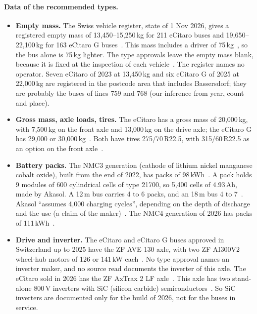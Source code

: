 \documentclass[11pt,a4paper]{article}
\theoremstyle{plain}
\theoremstyle{definition}
\theoremstyle{remark}
\begin{document}
\paragraph{Data of the recommended types.}
\begin{itemize}
  \item \textbf{Empty mass.} The Swiss vehicle register, state of 1 Nov 2026, gives a registered empty mass of 13,450--15,250\,kg for 211 eCitaro buses and 19,650--22,100\,kg for 163 eCitaro G buses~\cite{ASTRA2026Stock}.
    This mass includes a driver of 75\,kg~\cite[Art.~7 para.~1]{VTS2026}, so the bus alone is 75\,kg lighter.
    The type approvals leave the empty mass blank, because it is fixed at the inspection of each vehicle~\cite[approval 2MB442, remark Z18]{ASTRA2026TG}.
    The register names no operator.
    Seven eCitaro of 2023 at 13,450\,kg and six eCitaro G of 2025 at 22,000\,kg are registered in the postcode area that includes Bassersdorf; they are probably the buses of lines 759 and 768 (our inference from year, count and place).
  \item \textbf{Gross mass, axle loads, tires.} The eCitaro has a gross mass of 20,000\,kg, with 7,500\,kg on the front axle and 13,000\,kg on the drive axle; the eCitaro G has 29,000 or 30,000\,kg~\cite[p.~9]{Daimler2026eCitaro}.
    Both have tires 275/70\,R22.5, with 315/60\,R22.5 as an option on the front axle~\cite[p.~4]{Daimler2026eCitaro}.
  \item \textbf{Battery packs.} The NMC3 generation (cathode of lithium nickel manganese cobalt oxide), built from the end of 2022, has packs of 98\,kWh~\cite{DaimlerTruck2022eCitaro,DaimlerTruck2023eCitaro}.
    A pack holds 9 modules of 600 cylindrical cells of type 21700, so 5,400 cells of 4.93\,Ah, made by Akasol.
    A 12\,m bus carries 4 to 6 packs, and an 18\,m bus 4 to 7~\cite{DaimlerTruck2022eCitaro}\cite[p.~10]{Daimler2026eCitaro}.
    Akasol ``assumes 4,000 charging cycles'', depending on the depth of discharge and the use (a claim of the maker)~\cite{DaimlerTruck2022eCitaro,DaimlerTruck2023eCitaro}.
    The NMC4 generation of 2026 has packs of 111\,kWh~\cite[p.~10]{Daimler2026eCitaro}.
  \item \textbf{Drive and inverter.} The eCitaro and eCitaro G buses approved in Switzerland up to 2025 have the ZF AVE 130 axle, with two ZF AI300V2 wheel-hub motors of 126 or 141\,kW each~\cite{ASTRA2026TG}.
    No type approval names an inverter maker, and no source read documents the inverter of this axle.
    The eCitaro sold in 2026 has the ZF AxTrax 2 LF axle~\cite[p.~6]{Daimler2026eCitaro}.
    This axle has two stand-alone 800\,V inverters with SiC (silicon carbide) semiconductors~\cite[pp.~2,~5,~7]{ZF2026AxTrax}.
    So SiC inverters are documented only for the build of 2026, not for the buses in service.
\end{itemize}
\end{document}
